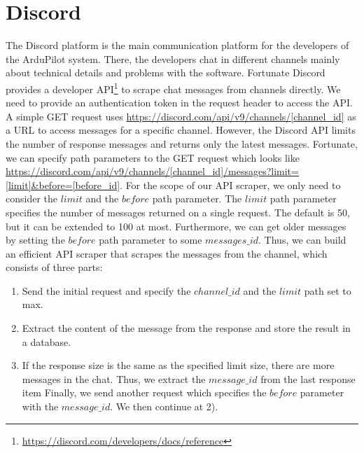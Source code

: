 \section{Discord}\label{sec:discord-webscraping}
The Discord platform is the main communication platform for the developers of the ArduPilot system.
There, the developers chat in different channels mainly about technical details and problems with the software.
Fortunate Discord provides a developer API\footnote{\url{https://discord.com/developers/docs/reference}} to scrape chat messages from channels directly.
We need to provide an authentication token in the request header to access the \ac{API}.
A simple GET request uses \url{https://discord.com/api/v9/channels/[channel_id]} as a \ac{URL} to access messages for a specific channel.
However, the Discord \ac{API} limits the number of response messages and returns only the latest messages.
Fortunate, we can specify path parameters to the GET request which looks like \url{https://discord.com/api/v9/channels/[channel_id]/messages?limit=[limit]&before=[before_id]}.
For the scope of our \ac{API} scraper, we only need to consider the $limit$ and the $before$ path parameter.
The $limit$ path parameter specifies the number of messages returned on a single request.
The default is 50, but it can be extended to 100 at most.
Furthermore, we can get older messages by setting the $before$ path parameter to some $messages\_id$.
Thus, we can build an efficient \ac{API} scraper that scrapes the messages from the channel, which consists of three parts:
\begin{enumerate}
    \item Send the initial request and specify the $channel\_id$ and the $limit$ path set to max.
    \item Extract the content of the message from the response and store the result in a database.
    \item If the response size is the same as the specified limit size, there are more messages in the chat.
    Thus, we extract the $message\_id$ from the last response item
    Finally, we send another request which specifies the $before$ parameter with the $message\_id$.
    We then continue at 2).
\end{enumerate}


